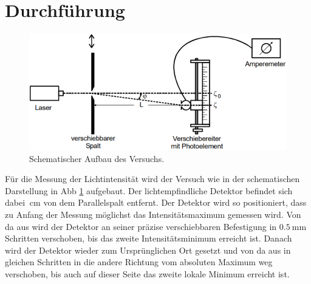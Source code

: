 \section{Durchführung}
\label{sec:Durchführung}

\begin{figure}
    \centering
    \includegraphics[width=\textwidth]{data/aufbau.png}
    \caption{Schematischer Aufbau des Versuchs.}
    \label{fig:aufbau}
\end{figure}

Für die Messung der Lichtintensität wird der Versuch wie in der schematischen Darstellung in Abb \ref{fig:aufbau} aufgebaut. Der 
lichtempfindliche Detektor befindet sich dabei $\SI{}{\centi\metre} $ von dem Parallelspalt entfernt. Der Detektor wird so positioniert, 
dass zu Anfang der Messung möglichst das Intensitätsmaximum gemessen wird. Von da aus wird der Detektor an seiner präzise verschiebbaren 
Befestigung in $\SI{0.5}{\milli\metre} $ Schritten verschoben, bis das zweite Intensitätsminimum erreicht ist. Danach wird der Detektor
wieder zum Ursprünglichen Ort gesetzt und von da aus in gleichen Schritten in die andere Richtung vom absoluten Maximum weg verschoben, 
bis auch auf dieser Seite das zweite lokale Minimum erreicht ist. 
